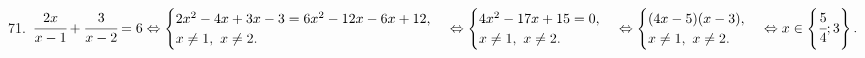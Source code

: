 71. $\cfrac{2x}{x-1}+\cfrac{3}{x-2}=6\Leftrightarrow \begin{cases}2x^2-4x+3x-3=6x^2-12x-6x+12,\\ x\neq1,\ x\neq2.\end{cases}
\Leftrightarrow \begin{cases}4x^2-17x+15=0,\\ x\neq1,\ x\neq2.\end{cases}
\Leftrightarrow \begin{cases}(4x-5)(x-3),\\ x\neq1,\ x\neq2.\end{cases}\Leftrightarrow x\in\left\{\cfrac{5}{4};3\right\}.$\\
